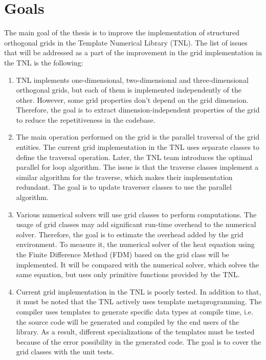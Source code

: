
\chapter*{Goals}

The main goal of the thesis is to improve the implementation of structured orthogonal grids in the Template Numerical Library (TNL).
The list of issues that will be addressed as a part of the improvement in the grid implementation in the TNL is the following:

\begin{enumerate}
 \item TNL implements one-dimensional, two-dimensional and three-dimensional orthogonal grids, but each of them is implemented independently of the other.
       However, some grid properties don’t depend on the grid dimension.
       Therefore, the goal is to extract dimension-independent properties of the grid to reduce the repetitiveness in the codebase.
 \item The main operation performed on the grid is the parallel traversal of the grid entities.
       The current grid implementation in the TNL uses separate classes to define the traversal operation.
       Later, the TNL team introduces the optimal parallel for loop algorithm.
       The issue is that the traverse classes implement a similar algorithm for the traverse, which makes their implementation redundant.
       The goal is to update traverser classes to use the parallel algorithm.
 \item Various numerical solvers will use grid classes to perform computations.
       The usage of grid classes may add significant run-time overhead to the numerical solver.
       Therefore, the goal is to estimate the overhead added by the grid environment.
       To measure it, the numerical solver of the heat equation using the Finite Difference Method (FDM) based on the grid class will be implemented.
       It will be compared with the numerical solver, which solves the same equation, but uses only primitive functions provided by the TNL.
 \item Current grid implementation in the TNL is poorly tested.
       In addition to that, it must be noted that the TNL actively uses template metaprogramming.
       The compiler uses templates to generate specific data types at compile time, i.e. the source code will be generated and compiled by the end users of the library.
       As a result, different specializations of the templates must be tested because of the error possibility in the generated code.
       The goal is to cover the grid classes with the unit tests.
\end{enumerate}


